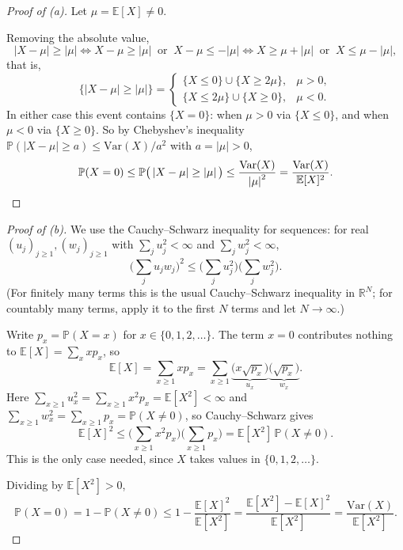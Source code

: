 \documentclass[a4paper,12pt]{article}
\newcommand{\card}[1]{\left| #1 \right|}
\newcommand{\mb}[1]{\mathbb{#1}}
\begin{document}
\begin{proof}[Proof of (a)]
	Let $\mu = \mb E[X] \neq 0$.

	Removing the absolute value,
	\[
		\card{X - \mu} \ge \card \mu
		\iff X - \mu \ge \card \mu \ \text{ or } \ X - \mu \le -\card \mu
		\iff X \ge \mu + \card \mu \ \text{ or } \ X \le \mu - \card \mu,
	\]
	that is,
	\[
		\{ \card{X - \mu} \ge \card \mu \} =
		\begin{cases}
			\{ X \le 0 \} \cup \{ X \ge 2\mu \}, & \mu > 0, \\
			\{ X \le 2\mu \} \cup \{ X \ge 0 \}, & \mu < 0.
		\end{cases}
	\]
	In either case this event contains $\{X = 0\}$: when $\mu > 0$ via $\{X \le 0\}$, and when $\mu < 0$ via $\{X \ge 0\}$. So by Chebyshev's inequality $\mb P(\card{X - \mu} \ge a) \le \mathrm{Var}(X)/a^2$ with $a = \card \mu > 0$,
	\[
		\mb P(X = 0) \le \mb P\big( \card{X - \mu} \ge \card{\mu} \big) \le \frac{\mathrm{Var}(X)}{\card \mu^2} = \frac{\mathrm{Var}(X)}{\mb E[X]^2}. \qedhere
	\]
\end{proof}

\begin{proof}[Proof of (b)]
	We use the Cauchy--Schwarz inequality for sequences: for real $(u_j)_{j \ge 1}, (w_j)_{j \ge 1}$ with $\sum_j u_j^2 < \infty$ and $\sum_j w_j^2 < \infty$,
	\[
		\Big( \sum_j u_j w_j \Big)^2 \le \Big( \sum_j u_j^2 \Big) \Big( \sum_j w_j^2 \Big).
	\]
	(For finitely many terms this is the usual Cauchy--Schwarz inequality in $\mb R^N$; for countably many terms, apply it to the first $N$ terms and let $N \to \infty$.)

	Write $p_x = \mb P(X = x)$ for $x \in \{0, 1, 2, \hdots\}$. The term $x = 0$ contributes nothing to $\mb E[X] = \sum_x x p_x$, so
	\[
		\mb E[X] = \sum_{x \ge 1} x p_x = \sum_{x \ge 1} \underbrace{\big( x \sqrt{p_x} \big)}_{u_x} \underbrace{\big( \sqrt{p_x} \big)}_{w_x}.
	\]
	Here $\sum_{x \ge 1} u_x^2 = \sum_{x \ge 1} x^2 p_x = \mb E[X^2] < \infty$ and $\sum_{x \ge 1} w_x^2 = \sum_{x \ge 1} p_x = \mb P(X \neq 0)$, so Cauchy--Schwarz gives
	\[
		\mb E[X]^2 \le \Big( \sum_{x \ge 1} x^2 p_x \Big) \Big( \sum_{x \ge 1} p_x \Big) = \mb E[X^2] \, \mb P(X \neq 0).
	\]
	This is the only case needed, since $X$ takes values in $\{0, 1, 2, \hdots\}$.

	Dividing by $\mb E[X^2] > 0$,
	\[
		\mb P(X = 0) = 1 - \mb P(X \neq 0) \le 1 - \frac{\mb E[X]^2}{\mb E[X^2]} = \frac{\mb E[X^2] - \mb E[X]^2}{\mb E[X^2]} = \frac{\mathrm{Var}(X)}{\mb E[X^2]}.
	\]
\end{proof}
\end{document}
